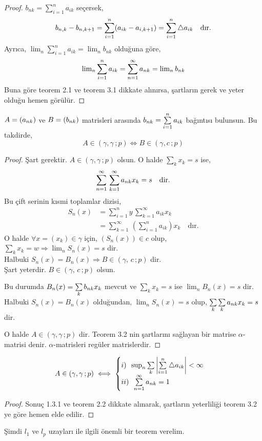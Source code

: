 \begin{proof}
$b_{nk}=\sum\limits_{i=1}^na_{ik}$ seçersek,
$$
b_{n,k}-b_{n,k+1}=\sum\limits_{i=1}^n(a_{ik}-a_{i,k+1})=\sum\limits_{i=1}^n\bigtriangleup a_{ik}\quad\text{dır.}
$$
Ayrıca, $\lim_n\sum\limits_{i=1}^na_{ik}=\lim_nb_{nk}$ olduğuna göre,
$$
\mathop{\rm lim}\nolimits_n\sum\limits_{i=1}^na_{ik}=\sum\limits_{n=1}^\infty a_{nk}=\mathop{\rm lim}\nolimits_nb_{nk}
$$
Buna göre teorem 2.1 ve teorem 3.1 dikkate alınırsa, şartların gerek ve yeter olduğu hemen görülür.

\end{proof}
\begin{theorem}
$A=(a_{nk})$ ve $B=(b_{nk})$ matrisleri arasında $b_{nk}=\sum\limits_{i=1}^na_{ik}$ bağıntısı bulunsun. Bu takdirde,
$$
A\in(\gamma, \gamma\, ; p)\iff B\in(\gamma, c\, ; p)
$$
\end{theorem}

\begin{proof}
Şart gerektir. $A\in(\gamma, \gamma\,; p)$ olsun. O halde $\sum_kx_k=s$ ise,
$$
\sum\limits_{n=1}^\infty\,\sum_{k=1}^\infty a_{nk} x_k=s \quad\text{dir.}
$$
Bu çift serinin kısmi toplamlar dizisi,
$$\begin{aligned}
S_n(x)&=\sum\limits_{i=1}^ny\,\sum_{k=1}^\infty a_{ik} x_k\\
&=\sum_{k=1}^\infty\,\left(\sum\limits_{i=1}^n a_{ik}\right) x_k\quad\text{dır.}
\end{aligned}$$
O halde $\forall x=(x_k)\in\gamma$ için, $(S_n(x))\in c$ olup, $\sum\limits_kx_k=w\Rightarrow\lim_nS_n(x)=s$ dir.\\[5pt]

Halbuki $S_n(x)=B_n(x)\Rightarrow B\in(\gamma,\,c\,;p)$ dir.\\[5pt]
Şart yeterdir. $B\in(\gamma,\,c\,;p)$ olsun.

Bu durumda $B_n(x)=\sum\limits_kb_{nk} x_k$ mevcut ve $\sum_kx_k=s$ ise $\lim_nB_n(x)=s$ dir. Halbuki $S_n(x)=B_n(x)$ olduğundan, $\lim_nS_n(x)=s$ olup, $\sum\limits_k\sum\limits_ka_{nk} x_k=s$ dir.

O halde $A\in(\gamma, \gamma\,;p)$ dir. Teorem 3.2 nin şartlarını sağlayan bir matrise $\alpha$-matrisi denir. $\alpha$-matrisleri regüler matrislerdir.
\end{proof}
\begin{corollary}
$$A\in(\gamma, \gamma\,;p)\iff
\begin{cases}
i)\,\,\,\sup_n\sum\limits_k\left|\sum\limits_{i=1}^n\bigtriangleup a_{ik}\right|<\infty\\
ii)\,\,\,\sum\limits_{n=1}^\infty a_{nk}=1
\end{cases}
$$
\end{corollary}
\begin{proof}
Sonuç 1.3.1 ve teorem 2.2 dikkate alınarak, şartların yeterliliği teorem 3.2 ye göre hemen elde edilir.
\end{proof}
Şimdi $l_1$ ve $l_p$ uzayları ile ilgili önemli bir teorem verelim.\\[5pt]

